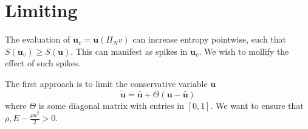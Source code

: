 \documentclass[preprint,10pt]{article}
\theoremstyle{definition}
\theoremstyle{lemma}
\newtheorem{lemma}{Lemma}
\theoremstyle{theorem}
\newtheorem{theorem}{Theorem}
\theoremstyle{assumption}
\renewcommand{\hat}{\widehat}
\newcommand{\pd}[2]{\frac{\partial#1}{\partial#2}}
\newcommand{\LRp}[1]{\left( #1 \right)}
\newcommand{\LRc}[1]{\left\{ #1 \right\}}
\newcommand{\LRl}[1]{\left. \LRp{#1} \right|}
\newcommand{\avg}[1] {\ensuremath{\LRc{\!\{#1\}\!}}}
\newcommand{\Grad} {\ensuremath{\nabla}}
\newcommand{\note}[1]{{\color{blue}{#1}}}
\begin{document}
{%
%
%
%


\section{Limiting}

The evaluation of $\bm{u}_v = \bm{u}\LRp{\Pi_N v}$ can increase entropy pointwise, such that $S(\bm{u}_v) \geq S(\bm{u})$.  This can manifest as spikes in $\bm{u}_v$.  We wish to mollify the effect of such spikes.  

The first approach is to limit the conservative variable $\bm{u}$
\[
\tilde{\bm{u}} = \bar{\bm{u}} + \Theta (\bm{u} - \bar{\bm{u}})
\]
where $\Theta$ is some diagonal matrix with entries in $[0,1]$.  We want to ensure that $\rho, E-\frac{\rho u^2}{2} > 0$.  

}
\end{document}
